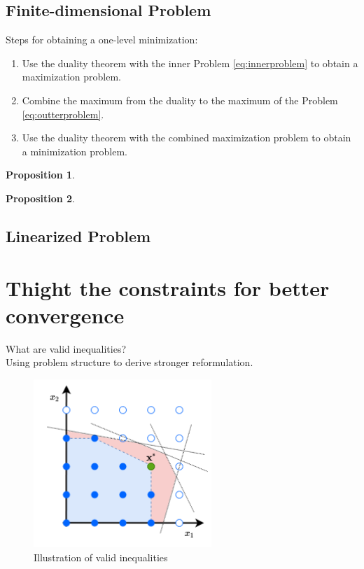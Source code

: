 \documentclass{beamer}
\newtheorem{proposition}{Proposition}
\begin{document}
	\subsection{Finite-dimensional Problem}
	\begin{frame}[allowframebreaks]
		Steps for obtaining a one-level minimization:
		\begin{enumerate}
			\item Use the duality theorem with the inner Problem \ref{eq:innerproblem} to obtain a maximization problem.
			\item Combine the maximum from the duality to the maximum of the Problem \ref{eq:outterproblem}.
			\item Use the duality theorem with the combined maximization problem to obtain a minimization problem.
		\end{enumerate}
		
		\framebreak
		\begin{proposition}
		\end{proposition}
		
		\framebreak
		\begin{proposition}
		\end{proposition}
	\end{frame}
	
	\subsection{Linearized Problem}
	\begin{frame}
	\end{frame}
	
	\section{Thight the constraints for better convergence} %
	\begin{frame}
		What are valid inequalities?\\
		Using problem structure to derive stronger reformulation.\\

		\begin{figure}[h]
			\centering
			\includegraphics[width=0.6\textwidth]{../figure/valid_ineq.png}
			\caption{Illustration of valid inequalities}
			\label{fig:sample-image}
		\end{figure}
	\end{frame}
	
\end{document}
